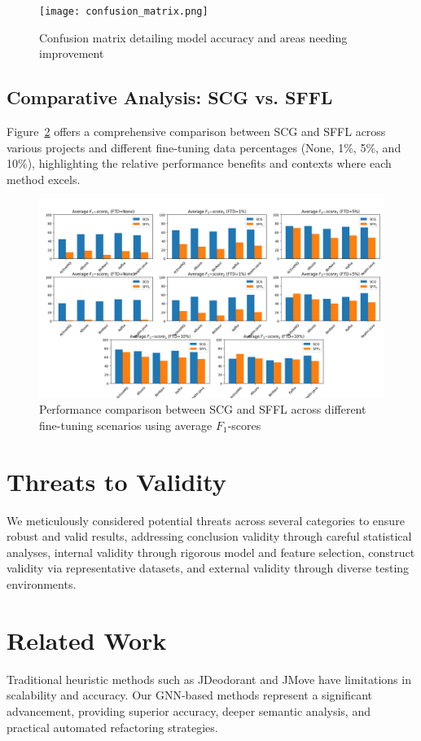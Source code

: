 \documentclass{article}
\begin{document}
\begin{figure}[ht!]
\centering
\texttt{[image: confusion\_matrix.png]}
\caption{Confusion matrix detailing model accuracy and areas needing improvement}
\label{fig:confusion}
\end{figure}

\subsection{Comparative Analysis: SCG vs. SFFL}
Figure~\ref{fig:scg_vs_sffl} offers a comprehensive comparison between SCG and SFFL across various projects and different fine-tuning data percentages (None, 1\%, 5\%, and 10\%), highlighting the relative performance benefits and contexts where each method excels.

\begin{figure}[ht!]
\centering
\includegraphics[width=1.0\textwidth]{SCGvsSFFL_F1_scores.png}
\caption{Performance comparison between SCG and SFFL across different fine-tuning scenarios using average $F_1$-scores}
\label{fig:scg_vs_sffl}
\end{figure}

\section{Threats to Validity}
We meticulously considered potential threats across several categories to ensure robust and valid results, addressing conclusion validity through careful statistical analyses, internal validity through rigorous model and feature selection, construct validity via representative datasets, and external validity through diverse testing environments.

\section{Related Work}
Traditional heuristic methods such as JDeodorant and JMove have limitations in scalability and accuracy. Our GNN-based methods represent a significant advancement, providing superior accuracy, deeper semantic analysis, and practical automated refactoring strategies.
\end{document}

